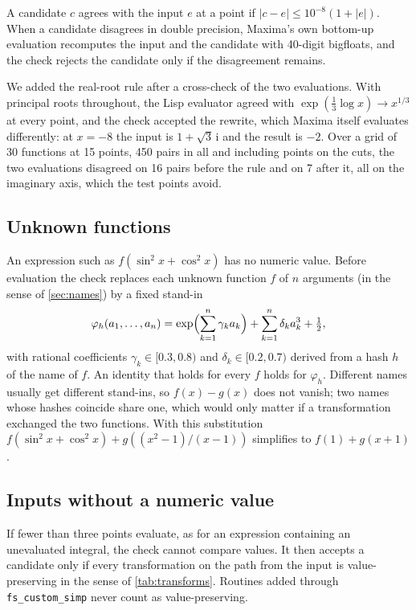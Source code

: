 \documentclass[11pt]{amsart}
\newcommand{\mx}{\lstinline[style=mx]}
\theoremstyle{definition}
\theoremstyle{remark}
\begin{document}
A candidate $c$ agrees with the input $e$ at a point if
$|c - e| \le 10^{-8}(1 + |e|)$. When a candidate disagrees in double
precision, Maxima's own bottom-up evaluation recomputes the input and the
candidate with 40-digit bigfloats, and the check rejects the candidate only
if the disagreement remains.

We added the real-root rule after a cross-check of the two evaluations. With
principal roots throughout, the Lisp evaluator agreed with
$\exp(\tfrac13\log x) \to x^{1/3}$ at every point, and the check accepted the
rewrite, which Maxima itself evaluates differently: at $x = -8$ the input
is $1 + \sqrt3\,\mathrm{i}$ and the result is $-2$. Over a grid of 30
functions at 15 points, 450 pairs in all and including points on the cuts,
the two evaluations disagreed on 16 pairs before the rule and on 7 after
it, all on the imaginary axis, which the test points avoid.

\subsection{Unknown functions}

An expression such as $f(\sin^2 x + \cos^2 x)$ has no numeric value. Before
evaluation the check replaces each unknown function $f$ of $n$ arguments
(in the sense of \cref{sec:names}) by a fixed stand-in
\[
  \varphi_h(a_1,\dots,a_n) = \exp\Bigl(\sum_{k=1}^{n} \gamma_k a_k\Bigr)
    + \sum_{k=1}^{n} \delta_k a_k^3 + \tfrac12,
\]
with rational coefficients $\gamma_k \in [0.3, 0.8)$ and
$\delta_k \in [0.2, 0.7)$ derived from a hash $h$ of the name of $f$. An
identity that holds for every $f$ holds for $\varphi_h$. Different names
usually get different stand-ins, so $f(x) - g(x)$ does not vanish; two names
whose hashes coincide share one, which would only matter if a transformation
exchanged the two functions. With this substitution
$f(\sin^2 x+\cos^2 x) + g((x^2-1)/(x-1))$ simplifies to $f(1) + g(x+1)$.

\subsection{Inputs without a numeric value}

If fewer than three points evaluate, as for an expression containing an
unevaluated integral, the check cannot compare values. It then accepts a
candidate only if every transformation on the path from the input is
value-preserving in the sense of \cref{tab:transforms}. Routines added
through \mx|fs_custom_simp| never count as value-preserving.
\end{document}
